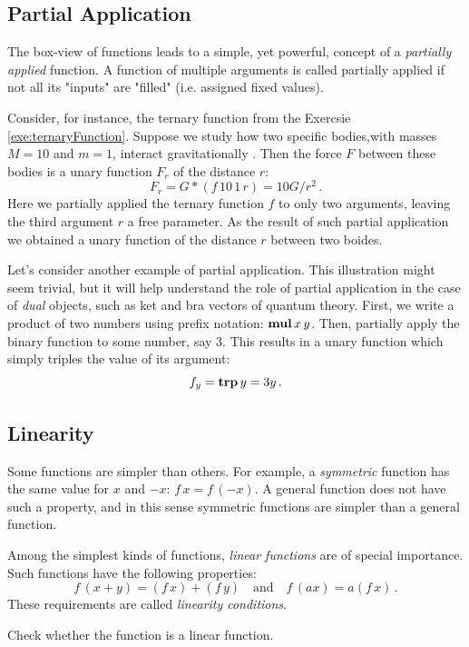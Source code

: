 \subsection{Partial Application}
The box-view of functions leads to a simple, yet powerful, concept of a \emph{partially applied} function. A function of multiple arguments is called partially applied if not all its "inputs" are "filled" (i.e. assigned fixed values). 

Consider, for instance, the ternary function from the Exercsie \ref{exe:ternaryFunction}. Suppose we study how two specific bodies,with masses $M=10$ and $m=1$, interact gravitationally . Then the force $F$ between these bodies is a unary function $F_r$ of the distance $r$:
\[
F_r = G*(f\,10\,1\,r) = 10G/r^2\,.
\]
Here we partially applied the ternary function $f$ to only two arguments, leaving the third argument $r$ a free parameter. As the result of such partial application we obtained a unary function of the distance $r$ between two boides.

Let's consider another example of partial application. This illustration might seem trivial, but it will help understand the role of partial application in the case of \emph{dual} objects, such as ket and bra vectors of quantum theory. First, we write a product of two numbers using prefix notation: $\textrm{\bf {mul}}\,x\,y$. Then, partially apply the binary function  to some number, say $3$. This results in a unary function  which simply triples the value of its argument:
\[
f_y = \textrm{\bf {trp}}\,y=3y\,.
\] 

\subsection{Linearity}
Some functions are simpler than others. For example, a \emph{symmetric} function has the same value for $x$ and $-x$: $f\,x=f\,(-x)$. A general function does not have such a property, and in this sense symmetric functions are simpler than a general function.

Among the simplest kinds of functions, \emph{linear functions} are of special importance. Such functions have the following properties:
\[
f\,(x+y) = (f\, x)+(f\,y)\quad\textrm{and}\quad f\,(ax)=a(f\, x)\,.
\]
These requirements are called \emph{linearity conditions}.

\begin{exercise}
	Check whether the function  is a linear function.
\end{exercise}

